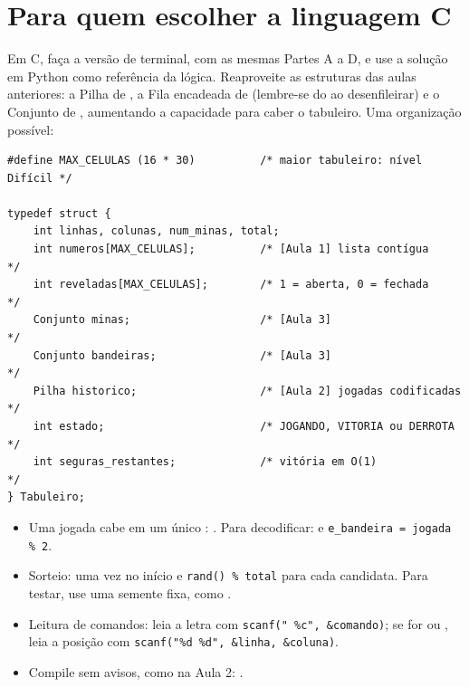 \documentclass[11pt]{article}
\begin{document}
\section{Para quem escolher a linguagem C}

Em C, faça a versão de terminal, com as mesmas Partes A a D, e use a solução em Python como
referência da lógica. Reaproveite as estruturas das aulas anteriores: a Pilha de
, a Fila encadeada de  (lembre-se do
 ao desenfileirar) e o Conjunto de ,
aumentando a capacidade para caber o tabuleiro. Uma organização possível:

\begin{lstlisting}[style=c]
#define MAX_CELULAS (16 * 30)          /* maior tabuleiro: nível Difícil */

typedef struct {
    int linhas, colunas, num_minas, total;
    int numeros[MAX_CELULAS];          /* [Aula 1] lista contígua        */
    int reveladas[MAX_CELULAS];        /* 1 = aberta, 0 = fechada        */
    Conjunto minas;                    /* [Aula 3]                       */
    Conjunto bandeiras;                /* [Aula 3]                       */
    Pilha historico;                   /* [Aula 2] jogadas codificadas   */
    int estado;                        /* JOGANDO, VITORIA ou DERROTA    */
    int seguras_restantes;             /* vitória em O(1)                */
} Tabuleiro;
\end{lstlisting}

\begin{itemize}
  \item Uma jogada cabe em um único : .
        Para decodificar:  e \lstinline[style=inline]|e_bandeira = jogada % 2|.
  \item Sorteio:  uma vez no início e \lstinline[style=inline]|rand() % total| para cada
        candidata. Para testar, use uma semente fixa, como .
  \item Leitura de comandos: leia a letra com \lstinline[style=inline]|scanf(" %c", &comando)|;
        se for  ou , leia a posição com
        \lstinline[style=inline]|scanf("%d %d", &linha, &coluna)|.
  \item Compile sem avisos, como na Aula 2:
        .
\end{itemize}
\end{document}
